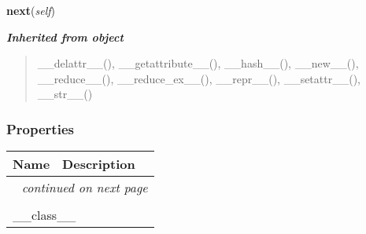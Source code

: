     \label{nMOLDYN:Core:IOFiles:DCDFile:next}

    \vspace{0.5ex}

\hspace{.8\funcindent}\begin{boxedminipage}{\funcwidth}

    \raggedright \textbf{next}(\textit{self})

\setlength{\parskip}{2ex}
\setlength{\parskip}{1ex}
    \end{boxedminipage}


\large{\textbf{\textit{Inherited from object}}}

\begin{quote}
\_\_delattr\_\_(), \_\_getattribute\_\_(), \_\_hash\_\_(), \_\_new\_\_(), \_\_reduce\_\_(), \_\_reduce\_ex\_\_(), \_\_repr\_\_(), \_\_setattr\_\_(), \_\_str\_\_()
\end{quote}


  \subsubsection{Properties}

    \vspace{-1cm}
\hspace{\varindent}\begin{longtable}{|p{\varnamewidth}|p{\vardescrwidth}|l}
\cline{1-2}
\cline{1-2} \centering \textbf{Name} & \centering \textbf{Description}& \\
\cline{1-2}
\endhead\cline{1-2}\multicolumn{3}{r}{\small\textit{continued on next page}}\\\endfoot\cline{1-2}
\endlastfoot\multicolumn{2}{|l|}{\textit{Inherited from object}}\\
\multicolumn{2}{|p{\varwidth}|}{\raggedright \_\_class\_\_}\\
\cline{1-2}
\end{longtable}


